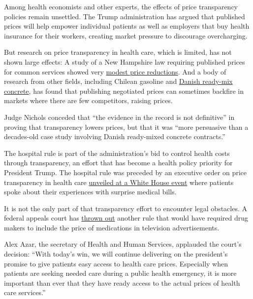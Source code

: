 Among health economists and other experts, the effects of price
transparency policies remain unsettled. The Trump administration has
argued that published prices will help empower individual patients as
well as employers that buy health insurance for their workers, creating
market pressure to discourage overcharging.

But research on price transparency in health care, which is limited, has
not shown large effects: A study of a New Hampshire law requiring
published prices for common services showed very
\href{https://www.mitpressjournals.org/doi/abs/10.1162/rest_a_00765}{modest
price reductions}. And a body of research from other fields, including
Chilean gasoline and
\href{https://www.nytimes3xbfgragh.onion/2019/06/24/upshot/transparency-medical-prices-could-backfire.html}{Danish
ready-mix concrete}, has found that publishing negotiated prices can
sometimes backfire in markets where there are few competitors, raising
prices.

Judge Nichols conceded that ``the evidence in the record is not
definitive'' in proving that transparency lowers prices, but that it was
``more persuasive than a decades-old case study involving Danish
ready-mixed concrete contracts.''

The hospital rule is part of the administration's bid to control health
costs through transparency, an effort that has become a health policy
priority for President Trump. The hospital rule was preceded by an
executive order on price transparency in health care
\href{https://www.nytimes3xbfgragh.onion/2019/06/24/upshot/health-care-price-transparency-trump.html}{unveiled
at a White House event} where patients spoke about their experiences
with surprise medical bills.

It is not the only part of that transparency effort to encounter legal
obstacles. A federal appeals court has
\href{https://www.nytimes3xbfgragh.onion/aponline/2020/06/17/business/bc-us-drug-prices-tv-ads.html}{thrown
out} another rule that would have required drug makers to include the
price of medications in television advertisements.

Alex Azar, the secretary of Health and Human Services, applauded the
court's decision: ``With today's win, we will continue delivering on the
president's promise to give patients easy access to health care prices.
Especially when patients are seeking needed care during a public health
emergency, it is more important than ever that they have ready access to
the actual prices of health care services.''

